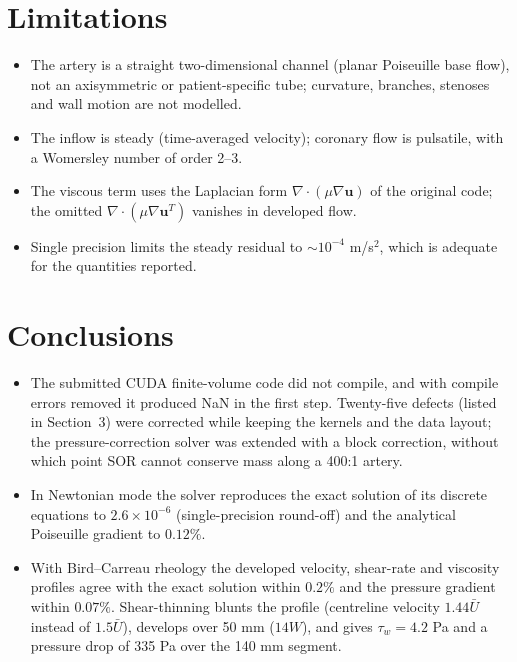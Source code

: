 \section{Limitations}
\begin{itemize}
\item The artery is a straight two-dimensional channel (planar Poiseuille base flow), not an axisymmetric or patient-specific tube; curvature, branches, stenoses and wall motion are not modelled.
\item The inflow is steady (time-averaged velocity); coronary flow is pulsatile, with a Womersley number of order 2--3.
\item The viscous term uses the Laplacian form $\nabla\cdot(\mu\nabla\mathbf{u})$ of the original code; the omitted $\nabla\cdot(\mu\nabla\mathbf{u}^T)$ vanishes in developed flow.
\item Single precision limits the steady residual to $\sim10^{-4}$ m/s$^2$, which is adequate for the quantities reported.
\end{itemize}

\section{Conclusions}
\begin{itemize}
\item The submitted CUDA finite-volume code did not compile, and with compile errors removed it produced NaN in the first step. Twenty-five defects (listed in Section~3) were corrected while keeping the kernels and the data layout; the pressure-correction solver was extended with a block correction, without which point SOR cannot conserve mass along a 400:1 artery.
\item In Newtonian mode the solver reproduces the exact solution of its discrete equations to $2.6\times10^{-6}$ (single-precision round-off) and the analytical Poiseuille gradient to $0.12\%$.
\item With Bird--Carreau rheology the developed velocity, shear-rate and viscosity profiles agree with the exact solution within $0.2\%$ and the pressure gradient within $0.07\%$. Shear-thinning blunts the profile (centreline velocity $1.44\bar U$ instead of $1.5\bar U$), develops over 50 mm ($14W$), and gives $\tau_w=4.2$ Pa and a pressure drop of 335 Pa over the 140 mm segment.
\end{itemize}

